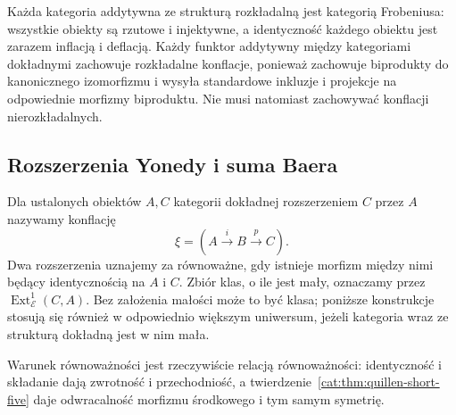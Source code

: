 \begin{przyklad}\label{cat:ex:quillen-split-frobenius}
Każda kategoria addytywna ze strukturą rozkładalną jest kategorią Frobeniusa: wszystkie obiekty są rzutowe i injektywne, a identyczność każdego obiektu jest zarazem inflacją i deflacją. Każdy funktor addytywny między kategoriami dokładnymi zachowuje rozkładalne konflacje, ponieważ zachowuje biprodukty do kanonicznego izomorfizmu i wysyła standardowe inkluzje i projekcje na odpowiednie morfizmy biproduktu. Nie musi natomiast zachowywać konflacji nierozkładalnych.
\end{przyklad}

\subsection{Rozszerzenia Yonedy i suma Baera}

\begin{definicja}\label{cat:def:quillen-yoneda-ext}
Dla ustalonych obiektów $A,C$ kategorii dokładnej rozszerzeniem $C$ przez $A$ nazywamy konflację
\[
 \xi=(A\xrightarrow{i}B\xrightarrow{p}C).
\]
Dwa rozszerzenia uznajemy za równoważne, gdy istnieje morfizm między nimi będący identycznością na $A$ i $C$. Zbiór klas, o ile jest mały, oznaczamy przez $\operatorname{Ext}^1_{\mathscr E}(C,A)$. Bez założenia małości może to być klasa; poniższe konstrukcje stosują się również w odpowiednio większym uniwersum, jeżeli kategoria wraz ze strukturą dokładną jest w nim mała.
\end{definicja}

Warunek równoważności jest rzeczywiście relacją równoważności: identyczność i składanie dają zwrotność i przechodniość, a twierdzenie~\ref{cat:thm:quillen-short-five} daje odwracalność morfizmu środkowego i tym samym symetrię.

